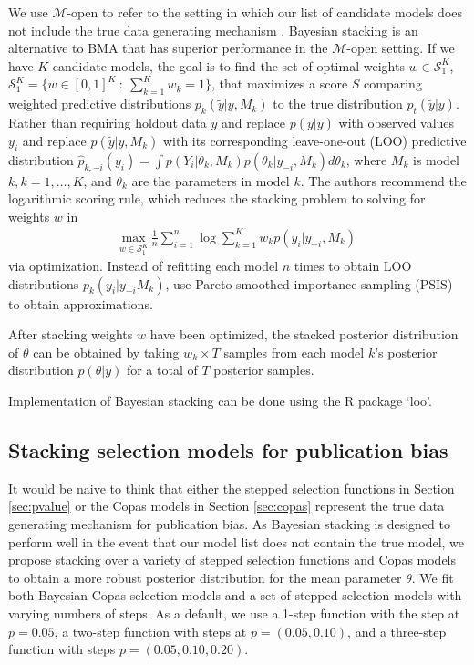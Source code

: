 \documentclass[12pt]{article}   	%
\numberwithin{equation}{section}
\begin{document}
We use $\mathcal{M}$-open to refer to the setting in which our list of candidate models does not include the true data generating mechanism \citep{bernardo2009}. Bayesian stacking \citep{yao2018stacking} is an alternative to BMA that has superior performance in the $\mathcal{M}$-open setting. If we have $K$ candidate models, the goal is to find the set of optimal weights $w \in \mathcal{S}_1^K$, $\mathcal{S}_1^K = \{w \in [0,1]^K \: : \: \sum_{k = 1}^K w_k = 1\}$, that maximizes a score $S$ comparing weighted predictive distributions  $p_k(\tilde{y} \vert y, M_k)$ to the true distribution $p_t(\tilde{y} \vert y)$. Rather than requiring holdout data $\tilde{y}$ and \citet{yao2018stacking} replace $p(\tilde{y} \vert y)$ with observed values $y_i$ and replace $p(\tilde{y} \vert y, M_k)$ with its corresponding leave-one-out (LOO) predictive distribution $\hat{p}_{k, -i}(y_i) = \int p(Y_i \vert \theta_k, M_k) p(\theta_k \vert y_{-i}, M_k) d\theta_k$, where $M_k$ is model $k, k = 1, \dots, K$, and $\theta_k$ are the parameters in model $k$. The authors recommend the logarithmic scoring rule, which reduces the stacking problem to solving for weights $w$ in 
\begin{align}
\underset{w \in \mathcal{S}_1^K}{\mbox{max}} \: \frac{1}{n} \sum_{i = 1}^n \log \sum_{k = 1}^K w_k p(y_i \vert y_{-i}, M_k)
\end{align}
via optimization. Instead of refitting each model $n$ times to obtain LOO distributions ${p}_{k}(y_i \vert y_{-i} M_k)$, \citet{yao2018stacking} use Pareto smoothed importance sampling (PSIS) \citep{vehtari2017psis} to obtain approximations. 

After stacking weights $w$ have been optimized, the stacked posterior distribution of $\theta$ can be obtained by taking $w_k \times T$ samples from each model $k$'s posterior distribution $p(\theta \vert y)$ for a total of $T$ posterior samples. 


Implementation of Bayesian stacking can be done using the R package `loo'. 


\subsection{Stacking selection models for publication bias} \label{sec:stacked_models}

It would be naive to think that either the stepped selection functions in Section \ref{sec:pvalue} or the Copas models in Section \ref{sec:copas} represent the true data generating mechanism for publication bias. As Bayesian stacking is designed to perform well in the event that our model list does not contain the true model, we propose stacking over a variety of stepped selection functions and Copas models to obtain a more robust posterior distribution for the mean parameter $\theta$. We fit both Bayesian Copas selection models \citep{mavridis2013copas, bai2020} and a set of stepped selection models with varying numbers of steps. As a default, we use a 1-step function with the step at $p=0.05$, a two-step function with steps at $p = (0.05, 0.10)$, and a three-step function with steps $p = (0.05, 0.10, 0.20)$. 
\end{document}
